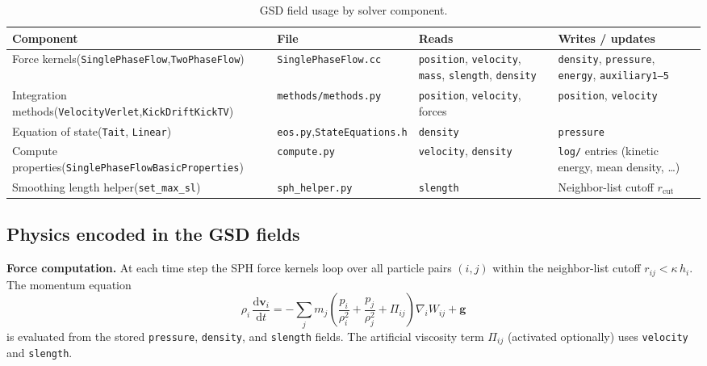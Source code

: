 \documentclass[10pt,a4paper]{article}
\begin{document}
\begin{table}[h]
\centering
\caption{GSD field usage by solver component.}
\label{tab:usage}
\small
\begin{tabular}{@{}p{3.2cm}lp{3.2cm}p{3.2cm}@{}}
\toprule
\textbf{Component} & \textbf{File} & \textbf{Reads} & \textbf{Writes / updates}\\
\midrule
Force kernels\newline (\texttt{SinglePhaseFlow},\newline \texttt{TwoPhaseFlow})
  & \texttt{SinglePhaseFlow.cc}
  & \texttt{position}, \texttt{velocity}, \texttt{mass}, \texttt{slength}, \texttt{density}
  & \texttt{density}, \texttt{pressure}, \texttt{energy}, \texttt{auxiliary1--5}\\[4pt]
Integration methods\newline (\texttt{VelocityVerlet},\newline \texttt{KickDriftKickTV})
  & \texttt{methods/methods.py}
  & \texttt{position}, \texttt{velocity}, forces
  & \texttt{position}, \texttt{velocity}\\[4pt]
Equation of state\newline (\texttt{Tait}, \texttt{Linear})
  & \texttt{eos.py},\newline \texttt{StateEquations.h}
  & \texttt{density}
  & \texttt{pressure}\\[4pt]
Compute properties\newline (\texttt{SinglePhaseFlow\-BasicProperties})
  & \texttt{compute.py}
  & \texttt{velocity}, \texttt{density}
  & \texttt{log/} entries (kinetic energy, mean density, \ldots)\\[4pt]
Smoothing length helper\newline (\texttt{set\_max\_sl})
  & \texttt{sph\_helper.py}
  & \texttt{slength}
  & Neighbor-list cutoff $r_\mathrm{cut}$\\
\bottomrule
\end{tabular}
\end{table}

\subsection{Physics encoded in the GSD fields}

\textbf{Force computation.}
At each time step the SPH force kernels loop over all particle pairs $(i,j)$
within the neighbor-list cutoff $r_{ij} < \kappa\,h_i$.  The momentum equation
\[
  \rho_i\,\frac{\mathrm{d}\mathbf{v}_i}{\mathrm{d}t}
  = -\sum_j m_j \!\left(\frac{p_i}{\rho_i^2} + \frac{p_j}{\rho_j^2}
    + \Pi_{ij}\right)\nabla_i W_{ij}
    + \mathbf{g}
\]
is evaluated from the stored \texttt{pressure}, \texttt{density}, and
\texttt{slength} fields.  The artificial viscosity term $\Pi_{ij}$ (activated
optionally) uses \texttt{velocity} and \texttt{slength}.
\end{document}
